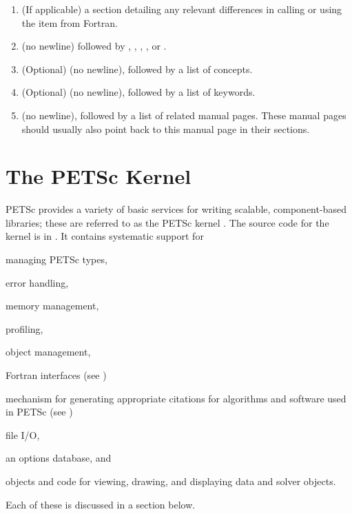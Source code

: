 \begin{enumerate}
  \item (If applicable) a  section detailing any relevant differences in calling or using the item from Fortran.
  \item \label{item:manpagelevel} (no newline) followed by , , , , or .
  \item (Optional)  (no newline), followed by a list of concepts.
  \item (Optional)  (no newline), followed by a list of keywords.
  \item {} (no newline), followed by a list of related manual pages. These manual pages should usually also point back to this manual page in their  sections.
\end{enumerate}

\chapter{The PETSc Kernel}
\label{chapter:kernel}
PETSc provides a variety of basic services for writing scalable,
component-based libraries; these are referred to as the PETSc
kernel \cite{bgms98}. The source code for the kernel is
in . It contains systematic support for
\begin{tightitemize}
  \item managing PETSc types,
  \item error handling,
  \item memory management,
  \item profiling,
  \item object management,
  \item Fortran interfaces (see \cite{BalayBrownKnepleyMcInnesSmith2015})
  \item mechanism for generating appropriate citations for algorithms and software used in PETSc (see \cite{knepley2013accurately})
  \item file I/O,
  \item an options database, and
  \item objects and code for viewing, drawing, and displaying data and solver objects.
\end{tightitemize}
Each of these is discussed in a section below.

